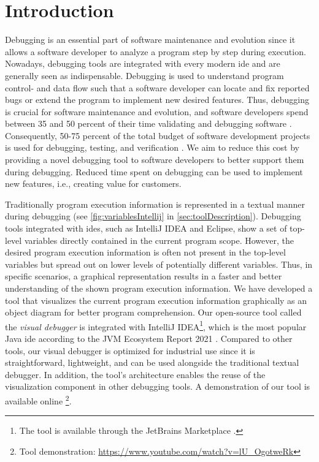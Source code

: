 \documentclass[conference]{IEEEtran}
\newcommand{\intellij}{IntelliJ IDEA}
\begin{document}
\section{Introduction}
Debugging is an essential part of software maintenance and evolution since it allows a software developer to analyze a program step by step during execution.
Nowadays, debugging tools are integrated with every modern \gls*{ide} and are generally seen as indispensable.
Debugging is used to understand program control- and data flow such that a software developer can locate and fix reported bugs or extend the program to implement new desired features.
Thus, debugging is crucial for software maintenance and evolution, and software developers spend between 35 and 50 percent of their time validating and debugging software \cite{odellDebuggingMindsetUnderstanding2017}.
Consequently, 50-75 percent of the total budget of software development projects is used for debugging, testing, and verification \cite{odellDebuggingMindsetUnderstanding2017}.
We aim to reduce this cost by providing a novel debugging tool to software developers to better support them during debugging.
Reduced time spent on debugging can be used to implement new features, i.e., creating value for customers.

Traditionally program execution information is represented in a textual manner during debugging (see \cref{fig:variablesIntellij} in \cref{sec:toolDescription}).
Debugging tools integrated with \glspl*{ide}, such as \intellij{} and Eclipse, show a set of top-level variables directly contained in the current program scope.
However, the desired program execution information is often not present in the top-level variables but spread out on lower levels of potentially different variables.
Thus, in specific scenarios, a graphical representation results in a faster and better understanding of the shown program execution information.
We have developed a tool that visualizes the current program execution information graphically as an object diagram for better program comprehension.
Our open-source tool called the \textit{visual debugger} is integrated with \intellij{}\footnote{The tool is available through the JetBrains Marketplace \cite{VisualDebuggerIntelliJ}.}, which is the most popular Java \gls*{ide} according to the JVM Ecosystem Report 2021 \cite{JVMEcosystemReport2021}.
Compared to other tools, our visual debugger is optimized for industrial use since it is straightforward, lightweight, and can be used alongside the traditional textual debugger.
In addition, the tool's architecture enables the reuse of the visualization component in other debugging tools.
A demonstration of our tool is available online \cite{ArtifactsICSME2022}\footnote{Tool demonstration: \url{https://www.youtube.com/watch?v=lU_OgotweRk}}.
\end{document}
